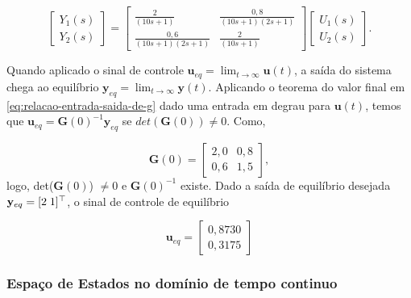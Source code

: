 \begin{equation}
    \label{eq:relacao-entrada-saida-de-g}
    \begin{bmatrix}
        Y_1(s) \\
        Y_2(s)
    \end{bmatrix}
    =
    \begin{bmatrix}
        \frac{2}{(10s+1)}         & \frac{0,8}{(10s+1)(2s+1)} \\
        \frac{0,6}{(10s+1)(2s+1)} & \frac{2}{(10s+1)}
    \end{bmatrix}
    \begin{bmatrix}
        U_1(s) \\
        U_2(s)
    \end{bmatrix}.
\end{equation}

Quando aplicado o sinal de controle $\mathbf{u}_{eq} = \lim_{t \rightarrow
        \infty }\mathbf{u}(t)$, a saída do sistema chega ao equilíbrio $\mathbf{y}_{eq}
    = \lim_{t \rightarrow \infty }\mathbf{y}(t)$. Aplicando o teorema do valor
final em \ref{eq:relacao-entrada-saida-de-g} dado uma entrada em degrau para
$\mathbf{u}(t)$, temos que $\mathbf{u}_{eq} = \mathbf{G}(0)^{-1}\mathbf{y}_{eq}$
se $det(\mathbf{G}(0)) \neq 0$. Como,

\begin{equation}
    \label{eq:ganho-estatico-de-g}
    \mathbf{G}(0)
    =
    \begin{bmatrix}
        2,0 & 0,8 \\
        0,6 & 1,5
    \end{bmatrix},
\end{equation}logo, det($\mathbf{G}(0)$) $\neq 0$ e $\mathbf{G}(0)^{-1}$ existe.
Dado a saída de equilíbrio desejada $\mathbf{y}_{eq} = [2 \thickspace 1]^\top$,
o sinal de controle de equilíbrio

\begin{equation}
    \label{eq:vetor-do-controle-de-equilibrio}
    \mathbf{u}_{eq} =
    \begin{bmatrix}
        0,8730 \\
        0,3175
    \end{bmatrix}
\end{equation}

\subsubsection{Espaço de Estados no domínio de tempo continuo}
\label{subsub:espaco-de-estados-no-dominio-de-tempo-continuo}

